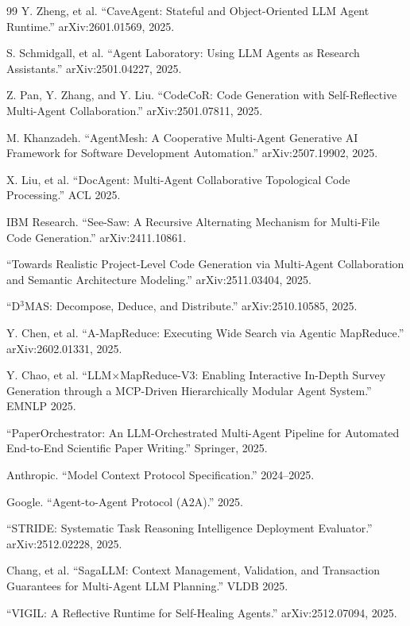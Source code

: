 \documentclass[11pt,a4paper]{article}
\begin{document}
\begin{thebibliography}{99}
Y. Zheng, et al. ``CaveAgent: Stateful and Object-Oriented LLM Agent Runtime.'' arXiv:2601.01569, 2025.

S. Schmidgall, et al. ``Agent Laboratory: Using LLM Agents as Research Assistants.'' arXiv:2501.04227, 2025.

Z. Pan, Y. Zhang, and Y. Liu. ``CodeCoR: Code Generation with Self-Reflective Multi-Agent Collaboration.'' arXiv:2501.07811, 2025.

M. Khanzadeh. ``AgentMesh: A Cooperative Multi-Agent Generative AI Framework for Software Development Automation.'' arXiv:2507.19902, 2025.

X. Liu, et al. ``DocAgent: Multi-Agent Collaborative Topological Code Processing.'' ACL 2025.

IBM Research. ``See-Saw: A Recursive Alternating Mechanism for Multi-File Code Generation.'' arXiv:2411.10861.

``Towards Realistic Project-Level Code Generation via Multi-Agent Collaboration and Semantic Architecture Modeling.'' arXiv:2511.03404, 2025.

``D$^3$MAS: Decompose, Deduce, and Distribute.'' arXiv:2510.10585, 2025.

Y. Chen, et al. ``A-MapReduce: Executing Wide Search via Agentic MapReduce.'' arXiv:2602.01331, 2025.

Y. Chao, et al. ``LLM$\times$MapReduce-V3: Enabling Interactive In-Depth Survey Generation through a MCP-Driven Hierarchically Modular Agent System.'' EMNLP 2025.

``PaperOrchestrator: An LLM-Orchestrated Multi-Agent Pipeline for Automated End-to-End Scientific Paper Writing.'' Springer, 2025.

Anthropic. ``Model Context Protocol Specification.'' 2024--2025.

Google. ``Agent-to-Agent Protocol (A2A).'' 2025.

``STRIDE: Systematic Task Reasoning Intelligence Deployment Evaluator.'' arXiv:2512.02228, 2025.

Chang, et al. ``SagaLLM: Context Management, Validation, and Transaction Guarantees for Multi-Agent LLM Planning.'' VLDB 2025.

``VIGIL: A Reflective Runtime for Self-Healing Agents.'' arXiv:2512.07094, 2025.


\end{thebibliography}
\end{document}
